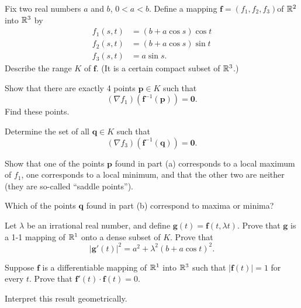 \begin{myexercise}
    \label{ex:9.12}
    Fix two real numbers $a$ and $b$, $0 <a< b$. 
    Define a mapping $\mathbf{f} = (f_1,f_2,f_3)$of ${\protect\mathbb R}^2$ into ${\protect\mathbb R}^3$ by
    \begin{align*}
        f_1(s,t)&=(b+a\cos s)\cos t \\
        f_2(s,t)&=(b+a\cos s)\sin t \\
        f_3(s,t)&=a\sin s.
    \end{align*}
    Describe the range $K$ of $\mathbf{f}$. 
    (It is a certain compact subset of ${\protect\mathbb R}^3$.)
    \begin{asparaenum}[(a)]
        \item Show that there are exactly 4 points $\mathbf{p} \in K$ such that
        \begin{equation*}
            (\nabla f_1)(\mathbf{f}^{-1}(\mathbf{p})) = \mathbf{0}.
        \end{equation*}
        Find these points.
        \item Determine the set of all $\mathbf{q} \in K$ such that
        \begin{equation*}
            (\nabla f_3)(\mathbf{f}^{-1}(\mathbf{q})) = \mathbf{0}.
        \end{equation*}
        \item Show that one of the points $\mathbf{p}$ found in part (a) corresponds to a local maximum of $f_1$, 
        one corresponds to a local minimum, 
        and that the other two are neither 
        (they are so-called ``saddle points'').

        Which of the points $\mathbf{q}$ found in part (b) correspond to maxima or minima?
        \item Let $\lambda$  be an irrational real number, 
        and define $\mathbf{g}(t) = \mathbf{f}(t, \lambda t)$. 
        Prove that $\mathbf{g}$ is a 1-1 mapping of ${\protect\mathbb R}^1$ onto a dense subset of $K$. 
        Prove that
        \begin{equation*}
            \left| \mathbf{g}'(t) \right|^2 =
            a^2 + \lambda^2(b + a \cos t)^2 .
        \end{equation*}
    \end{asparaenum}
\end{myexercise}


\begin{myexercise}
    \label{ex:9.13}
    Suppose $\mathbf{f}$ is a differentiable mapping of ${\protect\mathbb R}^1$ into ${\protect\mathbb R}^3$ 
    such that $|\mathbf{f}(t)|=1$ for every $t$.
    Prove that $\mathbf{f}'(t) \cdot \mathbf{f}(t) = 0$.

    Interpret this result geometrically.
\end{myexercise}


